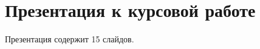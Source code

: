 % 
%  




\renewcommand{\contentsname}{\Large\bfseries\centering\hfil СОДЕРЖАНИЕ\hfil}
    \tableofcontents
    \normalsize

% 
% 









\section*{Презентация к курсовой работе}
Презентация содержит 15 слайдов.

% 
